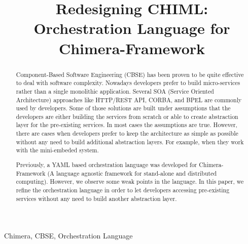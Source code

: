 \documentclass[conference]{IEEEtran}
\begin{document}

\title{Redesigning CHIML: Orchestration Language for Chimera-Framework}

\author{
\and
{}
\and
{}
}


\maketitle


\begin{abstract}
Component-Based Software Engineering (CBSE) has been proven to be quite effective to deal with software complexity. Nowadays developers prefer to build micro-services rather than a single monolithic application. Several SOA (Service Oriented Architecture) approaches like HTTP/REST API, CORBA, and BPEL are commonly used by developers. Some of those solutions are built under assumptions that the developers are either building the services from scratch or able to create abstraction layer for the pre-existing services. In most cases the assumptions are true. However, there are cases when developers prefer to keep the architecture as simple as possible without any need to build additional abstraction layers. For example, when they work with the mini-embeded system.

Previously, a YAML based orchestration language was developed for Chimera-Framework (A language agnostic framework for stand-alone and distributed computing). However, we observe some weak points in the language. In this paper, we refine the orchestration language in order to let developers accessing pre-existing services without any need to build another abstraction layer.
\end{abstract}

\begin{IEEEkeywords}
Chimera, CBSE, Orchestration Language
\end{IEEEkeywords}
\end{document}
